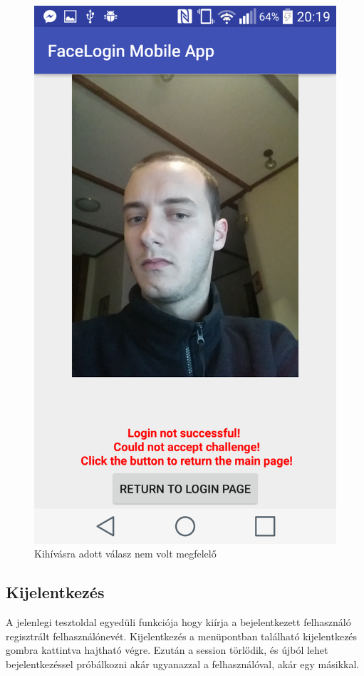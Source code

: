 \begin{figure}[h]
\begin{minipage}{.30\textwidth}
     \includegraphics[scale=0.10]{img/could_not_accept_challenge}
     \caption{Kihívásra adott válasz nem volt megfelelő}
 \end{minipage}
\end{figure}
\subsection{Kijelentkezés}
A jelenlegi tesztoldal egyedüli funkciója hogy kiírja a bejelentkezett felhasználó regisztrált felhasználónevét. Kijelentkezés a menüpontban található kijelentkezés gombra kattintva hajtható végre. Ezután a session törlődik, és újból lehet bejelentkezéssel próbálkozni akár ugyanazzal a felhasználóval, akár egy másikkal.

\newpage